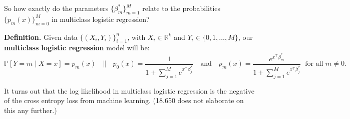 So how exactly do the parameters $\{\beta_m^*\}_{m = 1}^M$
relate to the probabilities $\{p_m(x)\}_{m = 0}^M$
in multiclass logistic regression?

\textbf{Definition.}
Given data $\{(X_i, Y_i)\}_{i = 1}^n$,
with $X_i \in \mathbb{R}^k$ and $Y_i \in \{0, 1, \dots, M\}$,
our \textbf{multiclass logistic regression} model will be:
\[ \mathbb{P}[Y = m \mid X = x] = p_m(x)
~~~ \parallel ~~~
p_0(x) = \frac{1}{1 + \sum_{j = 1}^M e^{x^{\top}\beta_j^*}}
~~~ \text{ and } ~~~
p_m(x) = \frac{e^{x^{\top}\beta_m^*}}{
    1 + \sum_{j = 1}^M e^{x^{\top}\beta_j^*}
} ~ \text{ for all } m \neq 0. \]

\begin{remark}
    It turns out that the log likelihood in multiclass logistic regression
    is the negative of the cross entropy loss from machine learning.
    (18.650 does not elaborate on this any further.)
\end{remark}

